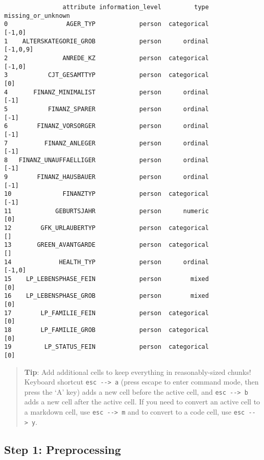 \documentclass[11pt]{article}
\begin{document}
    \begin{verbatim}
                attribute information_level         type missing_or_unknown
0                AGER_TYP            person  categorical             [-1,0]
1    ALTERSKATEGORIE_GROB            person      ordinal           [-1,0,9]
2               ANREDE_KZ            person  categorical             [-1,0]
3           CJT_GESAMTTYP            person  categorical                [0]
4       FINANZ_MINIMALIST            person      ordinal               [-1]
5           FINANZ_SPARER            person      ordinal               [-1]
6        FINANZ_VORSORGER            person      ordinal               [-1]
7          FINANZ_ANLEGER            person      ordinal               [-1]
8   FINANZ_UNAUFFAELLIGER            person      ordinal               [-1]
9        FINANZ_HAUSBAUER            person      ordinal               [-1]
10              FINANZTYP            person  categorical               [-1]
11            GEBURTSJAHR            person      numeric                [0]
12        GFK_URLAUBERTYP            person  categorical                 []
13       GREEN_AVANTGARDE            person  categorical                 []
14             HEALTH_TYP            person      ordinal             [-1,0]
15    LP_LEBENSPHASE_FEIN            person        mixed                [0]
16    LP_LEBENSPHASE_GROB            person        mixed                [0]
17        LP_FAMILIE_FEIN            person  categorical                [0]
18        LP_FAMILIE_GROB            person  categorical                [0]
19         LP_STATUS_FEIN            person  categorical                [0]
    \end{verbatim}

    
    \begin{quote}
\textbf{Tip}: Add additional cells to keep everything in
reasonably-sized chunks! Keyboard shortcut
\texttt{esc\ -\/-\textgreater{}\ a} (press escape to enter command mode,
then press the `A' key) adds a new cell before the active cell, and
\texttt{esc\ -\/-\textgreater{}\ b} adds a new cell after the active
cell. If you need to convert an active cell to a markdown cell, use
\texttt{esc\ -\/-\textgreater{}\ m} and to convert to a code cell, use
\texttt{esc\ -\/-\textgreater{}\ y}.
\end{quote}

\hypertarget{step-1-preprocessing}{%
\subsection{Step 1: Preprocessing}\label{step-1-preprocessing}}
\end{document}
